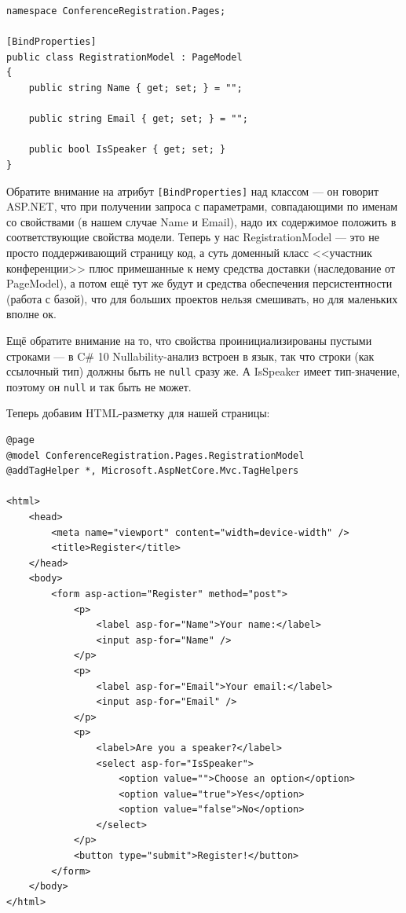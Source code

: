 \documentclass[a5paper]{article}
\begin{document}
\begin{verbatim}
namespace ConferenceRegistration.Pages;

[BindProperties]
public class RegistrationModel : PageModel
{
    public string Name { get; set; } = "";

    public string Email { get; set; } = "";

    public bool IsSpeaker { get; set; }
}
\end{verbatim}

Обратите внимание на атрибут \texttt{[BindProperties]} над классом --- он говорит ASP.NET, что при получении запроса с параметрами, совпадающими по именам со свойствами (в нашем случае Name и Email), надо их содержимое положить в соответствующие свойства модели. Теперь у нас RegistrationModel --- это не просто поддерживающий страницу код, а суть доменный класс <<участник конференции>> плюс примешанные к нему средства доставки (наследование от PageModel), а потом ещё тут же будут и средства обеспечения персистентности (работа с базой), что для больших проектов нельзя смешивать, но для маленьких вполне ок.

Ещё обратите внимание на то, что свойства проинициализированы пустыми строками --- в C\# 10 Nullability-анализ встроен в язык, так что строки (как ссылочный тип) должны быть не \texttt{null} сразу же. А IsSpeaker имеет тип-значение, поэтому он \texttt{null} и так быть не может.

Теперь добавим HTML-разметку для нашей страницы:

\begin{verbatim}
@page
@model ConferenceRegistration.Pages.RegistrationModel
@addTagHelper *, Microsoft.AspNetCore.Mvc.TagHelpers

<html>
    <head>
        <meta name="viewport" content="width=device-width" />
        <title>Register</title>
    </head>
    <body>
        <form asp-action="Register" method="post">
            <p>
                <label asp-for="Name">Your name:</label>
                <input asp-for="Name" />
            </p>
            <p>
                <label asp-for="Email">Your email:</label>
                <input asp-for="Email" />
            </p>
            <p>
                <label>Are you a speaker?</label>
                <select asp-for="IsSpeaker">
                    <option value="">Choose an option</option>
                    <option value="true">Yes</option>
                    <option value="false">No</option>
                </select>
            </p>
            <button type="submit">Register!</button>
        </form>
    </body>
</html>
\end{verbatim}
\end{document}
